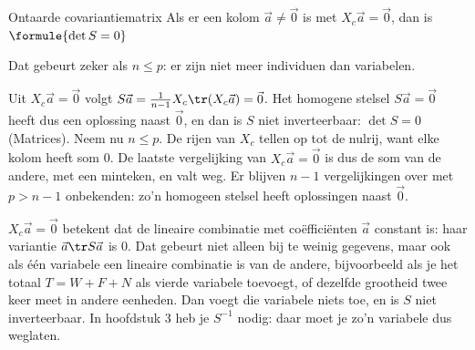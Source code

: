 \begin{theorie}
\begin{stelling}{Ontaarde covariantiematrix}
Als er een kolom $\vec a \neq \vec 0$ is met $X_c\vec a = \vec 0$, dan is \qquad $\formule{\det S = 0}$

\smallskip
Dat gebeurt zeker als $n \leqslant p$: er zijn niet meer individuen dan variabelen.
\end{stelling}

\begin{bewijs}
Uit $X_c\vec a = \vec 0$ volgt $S\vec a = \frac{1}{n-1}X_c\tr(X_c\vec a) = \vec 0$. Het homogene stelsel $S\vec a = \vec 0$ heeft dus een oplossing naast $\vec 0$, en dan is $S$ niet inverteerbaar: $\det S = 0$ (Matrices). Neem nu $n \leqslant p$. De rijen van $X_c$ tellen op tot de nulrij, want elke kolom heeft som 0. De laatste vergelijking van $X_c\vec a = \vec 0$ is dus de som van de andere, met een minteken, en valt weg. Er blijven $n - 1$ vergelijkingen over met $p > n - 1$ onbekenden: zo'n homogeen stelsel heeft oplossingen naast $\vec 0$.
\end{bewijs}
\end{theorie}

$X_c\vec a = \vec 0$ betekent dat de lineaire combinatie met coëfficiënten $\vec a$ constant is: haar variantie $\vec a\tr S\vec a$ is 0. Dat gebeurt niet alleen bij te weinig gegevens, maar ook als één variabele een lineaire combinatie is van de andere, bijvoorbeeld als je het totaal $T = W + F + N$ als vierde variabele toevoegt, of dezelfde grootheid twee keer meet in andere eenheden. Dan voegt die variabele niets toe, en is $S$ niet inverteerbaar. In hoofdstuk 3 heb je $S^{-1}$ nodig: daar moet je zo'n variabele dus weglaten.


